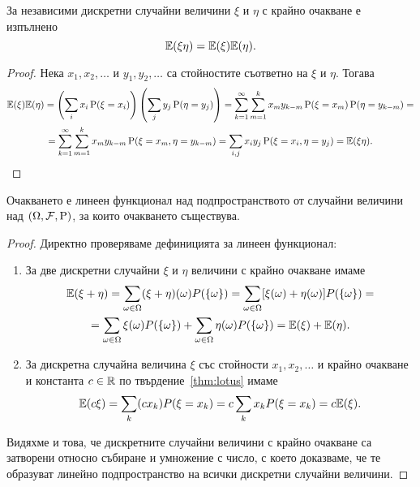 \documentclass[numbers=endperiod, DIV=15, bibliography=totocnumbered]{scrartcl}
\begin{document}
\begin{proposition}\label{thm:expect-independent}
  За независими дискретни случайни величини $\xi$ и $\eta$ с крайно очакване е изпълнено
  \begin{displaymath}
    \mathbb{E}(\xi \eta) = \mathbb{E}(\xi) \mathbb{E}(\eta).
  \end{displaymath}
\end{proposition}
\begin{proof}
  Нека $x_1, x_2, \ldots$ и $y_1, y_2, \ldots$ са стойностите съответно на $\xi$ и $\eta$. Тогава
  \begin{multline*}
    \mathbb{E}(\xi) \mathbb{E}(\eta)
    =
    \left( \sum_i x_i \operatorname{P}(\xi = x_i) \right) \left( \sum_j y_j \operatorname{P}(\eta = y_j) \right)
    =
    \sum_{k=1}^\infty \sum_{m=1}^k x_m y_{k-m} \operatorname{P}(\xi = x_m) \operatorname{P}(\eta = y_{k-m})
    = \\ =
    \sum_{k=1}^\infty \sum_{m=1}^k x_m y_{k-m} \operatorname{P}(\xi = x_m, \eta = y_{k-m})
    =
    \sum_{i, j} x_i y_j \operatorname{P}(\xi = x_i, \eta = y_j)
    =
    \mathbb{E}(\xi \eta).
  \end{multline*}
\end{proof}

\begin{proposition}\label{thm:expect-linear}
  Очакването е линеен функционал над подпространството от случайни величини над $(\Omega, \mathcal{F}, \operatorname{P})$, за които очакването съществува.
\end{proposition}
\begin{proof}
  Директно проверяваме дефиницията за линеен функционал:
  \begin{enumerate}
    \item За две дискретни случайни $\xi$ и $\eta$ величини с крайно очакване имаме
    \begin{multline*}
      \mathbb{E}(\xi + \eta)
      =
      \sum_{\omega \in \Omega} (\xi + \eta) (\omega) P(\{ \omega \})
      =
      \sum_{\omega \in \Omega} [\xi (\omega) + \eta (\omega)] P(\{ \omega \})
      = \\ =
      \sum_{\omega \in \Omega} \xi (\omega) P(\{ \omega \}) + \sum_{\omega \in \Omega} \eta (\omega) P(\{ \omega \})
      =
      \mathbb{E}(\xi) + \mathbb{E}(\eta).
    \end{multline*}

    \item За дискретна случайна величина $\xi$ със стойности $x_1, x_2, \ldots$ и крайно очакване и константа $c \in \mathbb{R}$ по твърдение~\ref{thm:lotus} имаме
    \begin{displaymath}
      \mathbb{E}(c \xi)
      =
      \sum_k (c x_k) P(\xi = x_k)
      =
      c \sum_k x_k P(\xi = x_k)
      =
      c \mathbb{E}(\xi).
    \end{displaymath}
  \end{enumerate}

  Видяхме и това, че дискретните случайни величини с крайно очакване са затворени относно събиране и умножение с число, с което доказваме, че те образуват линейно подпространство на всички дискретни случайни величини.
\end{proof}
\end{document}
